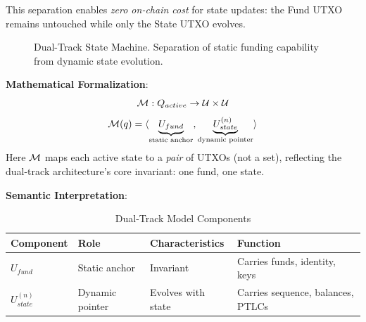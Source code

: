 This separation enables \textit{zero on-chain cost} for state updates: the Fund UTXO remains untouched while only the State UTXO evolves.

\begin{figure}[htbp]
\centering
{}
\caption{Dual-Track State Machine. Separation of static funding capability from dynamic state evolution.}
\label{fig:dual-track}
\end{figure}

\textbf{Mathematical Formalization}:
$$\mathcal{M}: Q_{active} \to \mathcal{U} \times \mathcal{U}$$
$$\mathcal{M}(q) = \langle \underbrace{U_{fund}}_{\text{static anchor}}, \underbrace{U_{state}^{(n)}}_{\text{dynamic pointer}} \rangle$$
Here $\mathcal{M}$ maps each active state to a \textit{pair} of UTXOs (not a set), reflecting the dual-track architecture's core invariant: one fund, one state.

\textbf{Semantic Interpretation}:
\begin{table}[htbp]
\centering
\small
\caption{Dual-Track Model Components}
\begin{tabular}{@{}llll@{}}
\toprule
\textbf{Component} & \textbf{Role} & \textbf{Characteristics} & \textbf{Function} \\
\midrule
$U_{fund}$ & Static anchor & Invariant & Carries funds, identity, keys \\
$U_{state}^{(n)}$ & Dynamic pointer & Evolves with state & Carries sequence, balances, PTLCs \\
\bottomrule
\end{tabular}
\end{table}

